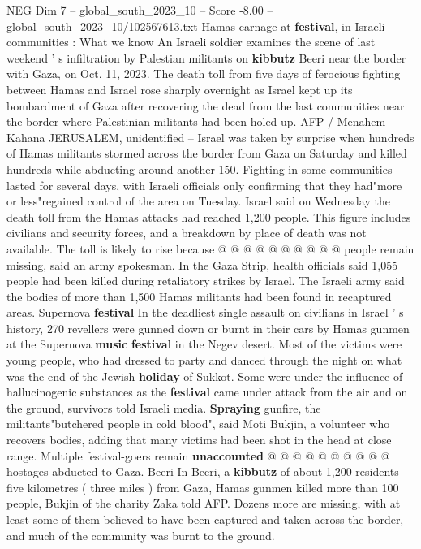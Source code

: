 \begin{textsample}{NEG Dim 7 – global\_south\_2023\_10 – Score -8.00 – global\_south\_2023\_10/102567613.txt}  \label{ex:f7_neg_318}
Hamas carnage at \textbf{festival}, in Israeli communities : What we know An Israeli soldier examines the scene of last weekend ' s infiltration by Palestian militants on \textbf{kibbutz} Beeri near the border with Gaza, on Oct. 11, 2023.
The death toll from five days of ferocious fighting between Hamas and Israel rose sharply overnight as Israel kept up its bombardment of Gaza after recovering the dead from the last communities near the border where Palestinian militants had been holed up.
AFP / Menahem Kahana JERUSALEM, unidentified -- Israel was taken by surprise when hundreds of Hamas militants stormed across the border from Gaza on Saturday and killed hundreds while abducting around another 150.
Fighting in some communities lasted for several days, with Israeli officials only confirming that they had"more or less"regained control of the area on Tuesday.
Israel said on Wednesday the death toll from the Hamas attacks had reached 1,200 people.
This figure includes civilians and security forces, and a breakdown by place of death was not available.
The toll is likely to rise because @ @ @ @ @ @ @ @ @ @ people remain missing, said an army spokesman.
In the Gaza Strip, health officials said 1,055 people had been killed during retaliatory strikes by Israel.
The Israeli army said the bodies of more than 1,500 Hamas militants had been found in recaptured areas.
Supernova \textbf{festival} In the deadliest single assault on civilians in Israel ' s history, 270 revellers were gunned down or burnt in their cars by Hamas gunmen at the Supernova \textbf{music} \textbf{festival} in the Negev desert.
Most of the victims were young people, who had dressed to party and danced through the night on what was the end of the Jewish \textbf{holiday} of Sukkot.
Some were under the influence of hallucinogenic substances as the \textbf{festival} came under attack from the air and on the ground, survivors told Israeli media. \textbf{Spraying} gunfire, the militants"butchered people in cold blood", said Moti Bukjin, a volunteer who recovers bodies, adding that many victims had been shot in the head at close range.
Multiple festival-goers remain \textbf{unaccounted} @ @ @ @ @ @ @ @ @ @ hostages abducted to Gaza.
Beeri In Beeri, a \textbf{kibbutz} of about 1,200 residents five kilometres ( three miles ) from Gaza, Hamas gunmen killed more than 100 people, Bukjin of the charity Zaka told AFP.
Dozens more are missing, with at least some of them believed to have been captured and taken across the border, and much of the community was burnt to the ground.

\end{textsample}
